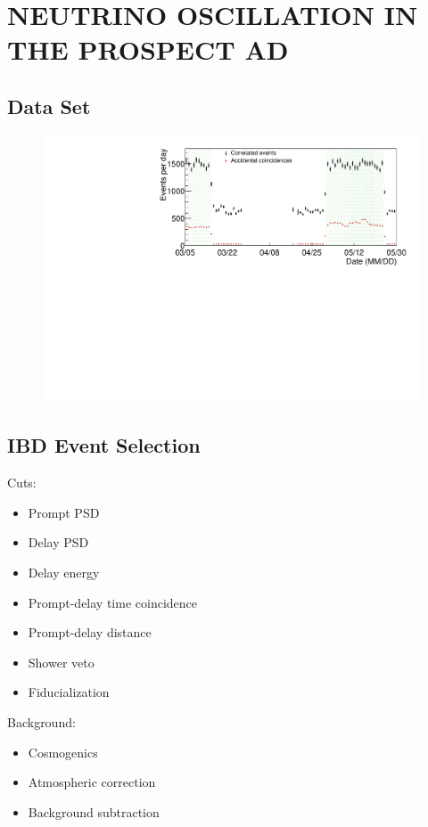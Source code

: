 \chapter{\uppercase{Neutrino Oscillation in the PROSPECT AD}}

\section{Data Set}
\begin{figure}[H]
	\centering
	\includegraphics[width=0.7\linewidth]{tex/7-oscillation-images/EvtRates}
	\caption{}
	\label{fig:evtrates}
\end{figure}


\section{IBD Event Selection}

Cuts: 
\begin{itemize}
	\item Prompt PSD
	\item Delay PSD
	\item Delay energy
	\item Prompt-delay time coincidence
	\item Prompt-delay distance
	\item Shower veto
	\item Fiducialization
\end{itemize}

\noindent Background:
\begin{itemize}
	\item Cosmogenics
	\item Atmospheric correction
	\item Background subtraction
\end{itemize}

